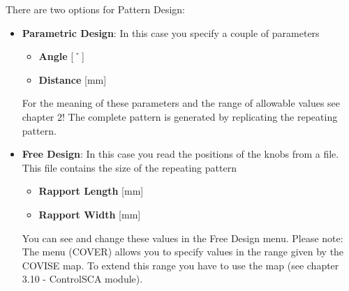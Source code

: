 There are two options for Pattern Design:
\begin{itemize}
\item {\bf Parametric Design}:\newline
 In this case you specify a couple of parameters
 	\begin{itemize}
	\item {\bf Angle} [$\symbol{23}$] 
	\item {\bf Distance} [mm]
	\end{itemize}
For the meaning of these parameters and the range of allowable values see chapter 2!
The complete pattern is generated by replicating the repeating pattern.
	
\item {\bf Free Design}:\newline 
In this case you read the positions of the knobs from a file.
This file contains the size of the repeating pattern  
	\begin{itemize}
	\item {\bf Rapport Length} [mm] 
	\item {\bf Rapport Width} [mm]
	\end{itemize}
You can see and change these values in the Free Design menu. \newline
Please note: The menu (COVER) allows you to specify
values in the range given by the COVISE map. To extend this range you have to
use the map (see chapter 3.10 - ControlSCA module).\newline
  

\end{itemize}
